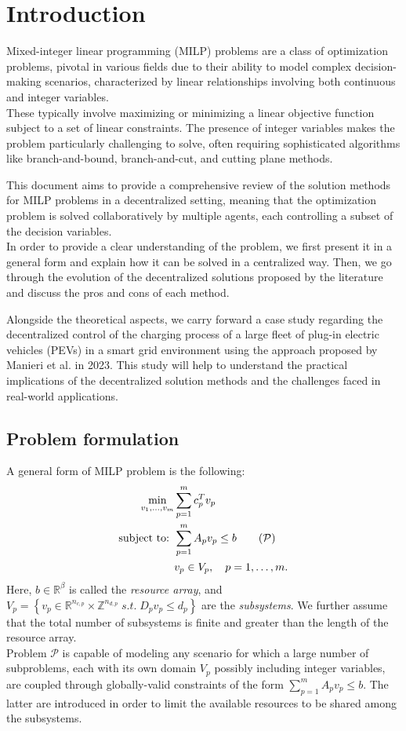 \section{Introduction}
Mixed-integer linear programming (MILP) problems are a class of optimization problems, pivotal in various fields due to their ability to model complex decision-making scenarios, characterized by linear relationships involving both continuous and integer variables. \\
These typically involve maximizing or minimizing a linear objective function subject to a set of linear constraints. The presence of integer variables makes the problem particularly challenging to solve, often requiring sophisticated algorithms like branch-and-bound, branch-and-cut, and cutting plane methods.

This document aims to provide a comprehensive review of the solution methods for MILP problems in a decentralized setting, meaning that the optimization problem is solved collaboratively by multiple agents, each controlling a subset of the decision variables. \\
In order to provide a clear understanding of the problem, we first present it in a general form and explain how it can be solved in a centralized way. Then, we go through the evolution of the decentralized solutions proposed by the literature and discuss the pros and cons of each method.

Alongside the theoretical aspects, we carry forward a case study regarding the decentralized control of the charging process of a large fleet of plug-in electric vehicles (PEVs) in a smart grid environment using the approach proposed by Manieri et al.\supercite{manieri} in 2023. This study will help to understand the practical implications of the decentralized solution methods and the challenges faced in real-world applications.

\subsection{Problem formulation}
A general form of MILP problem is the following:
\begin{align*}
    \min_{v_1, \dots, v_m} &\sum_{p=1}^{m} c_p^T v_p \\
    \text{subject to: } &\sum_{p=1}^{m} A_p v_p \leq b \tag{$\mathcal{P}$} \label{eq:MILP} \\
    & v_p \in V_p, \quad p = 1, \dots, m.
\end{align*}
Here, $b \in \mathbb{R}^{\beta}$ is called the \textit{resource array}, and $V_p = \left\{ v_p \in \mathbb{R}^{n_{c, p}} \times \mathbb{Z}^{n_{d, p}} \; s.t. \; D_p v_p \leq d_p\right\}$ are the \textit{subsystems}. We further assume that the total number of subsystems is finite and greater than the length of the resource array. \\
Problem $\mathcal{P}$ is capable of modeling any scenario for which a large number of subproblems, each with its own domain $V_p$ possibly including integer variables, are coupled through globally-valid constraints of the form $\sum_{p=1}^{m} A_p v_p \leq b$. The latter are introduced in order to limit the available resources to be shared among the subsystems\supercite{vujanic}.

